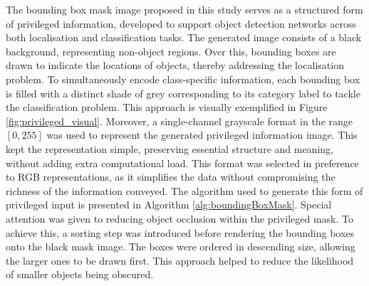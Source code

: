 The bounding box mask image proposed in this study serves as a structured form of privileged information, developed to support object detection networks across both localisation and classification tasks. The generated image consists of a black background, representing non-object regions. Over this, bounding boxes are drawn to indicate the locations of objects, thereby addressing the localisation problem. To simultaneously encode class-specific information, each bounding box is filled with a distinct shade of grey corresponding to its category label to tackle the classification problem. This approach is visually exemplified in Figure \ref{fig:privileged_visual}.
Moreover, a single-channel grayscale format in the range $[0, 255]$ was used to represent the generated privileged information image. This kept the representation simple, preserving essential structure and meaning, without adding extra computational load. This format was selected in preference to RGB representations, as it simplifies the data without compromising the richness of the information conveyed. The algorithm used to generate this form of privileged input is presented in Algorithm \ref{alg:boundingBoxMask}. Special attention was given to reducing object occlusion within the privileged mask. To achieve this, a sorting step was introduced before rendering the bounding boxes onto the black mask image. The boxes were ordered in descending size, allowing the larger ones to be drawn first. This approach helped to reduce the likelihood of smaller objects being obscured.

        
        

